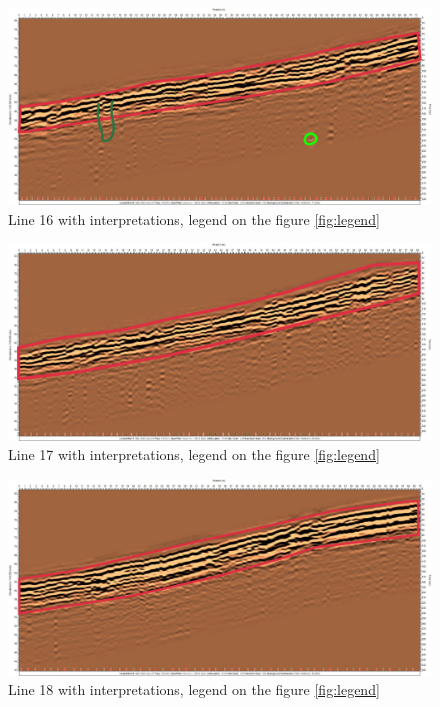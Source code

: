 \begin{figure}
    \centering
    \includegraphics[width=\linewidth]{Images/00_Results/line16_edited.jpg}
    \caption{Line 16 with interpretations, legend on the figure \ref{fig:legend}}
    \label{fig:line16}
\end{figure}

\begin{figure}
    \centering
    \includegraphics[width=\linewidth]{Images/00_Results/line17_edited.jpg}
    \caption{Line 17 with interpretations, legend on the figure \ref{fig:legend}}
    \label{fig:line17}
\end{figure}

\begin{figure}
    \centering
    \includegraphics[width=\linewidth]{Images/00_Results/line18_edited.jpg}
    \caption{Line 18 with interpretations, legend on the figure \ref{fig:legend}}
    \label{fig:line18}
\end{figure}


